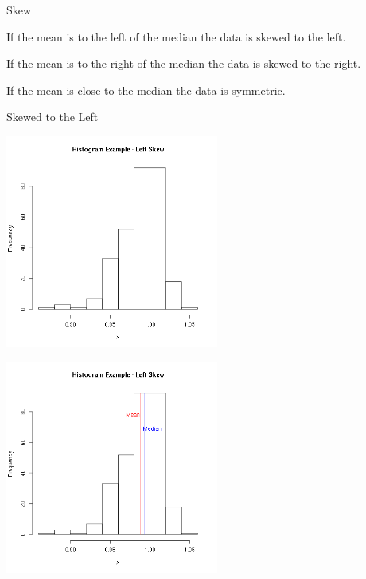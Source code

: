 \begin{frame}{Skew}

  \begin{definition}
    If the mean is to the left of the median the data is skewed to the
    left.
  \end{definition}

  \begin{definition}
    If the mean is to the right of the median the data is skewed to
    the right.
  \end{definition}

  \begin{definition}[Symmetric]
    If the mean is close to the median the data is symmetric.
  \end{definition}
  
\end{frame}

\begin{frame}{Skewed to the Left}

  {
    \includegraphics[width=7cm]{img/leftSkew}
  }

  {
    \includegraphics[width=7cm]{img/leftSkewAnnotated}
  }

  
\end{frame}


